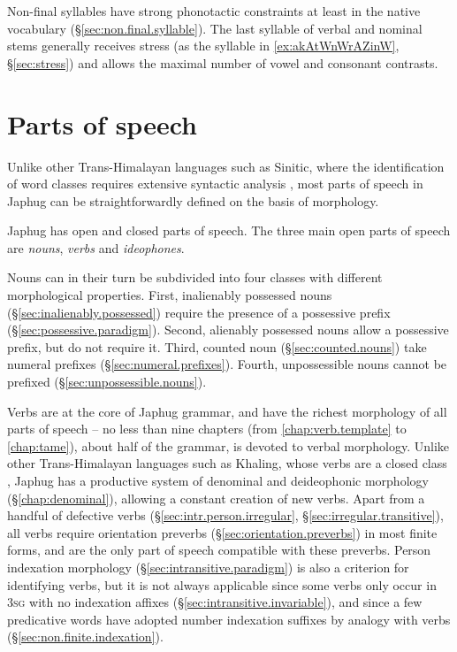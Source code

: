 Non-final syllables have strong phonotactic constraints at least in the native vocabulary (§\ref{sec:non.final.syllable}). The last syllable of verbal and nominal stems generally receives stress (as the syllable  in \ref{ex:akAtWnWrAZinW}, §\ref{sec:stress}) and allows the maximal number of vowel and consonant contrasts.


\section{Parts of speech} \label{sec:parts.speech.introduction}
Unlike other Trans-Himalayan languages such as Sinitic, where the identification of word classes requires extensive syntactic analysis \citep{gabelentz1881chinesische, chao68chinese}, most parts of speech in Japhug can be straightforwardly defined on the basis of morphology. 

Japhug has open and closed parts of speech. The three main open parts of speech are \textit{nouns}, \textit{verbs} and \textit{ideophones}.

Nouns can in their turn be subdivided into four classes with different morphological properties. First, inalienably possessed nouns (§\ref{sec:inalienably.possessed}) require the presence of a possessive prefix (§\ref{sec:possessive.paradigm}). Second, alienably possessed nouns allow a possessive prefix, but do not require it. Third, counted noun (§\ref{sec:counted.nouns}) take numeral prefixes (§\ref{sec:numeral.prefixes}). Fourth, unpossessible nouns cannot be prefixed (§\ref{sec:unpossessible.nouns}).

Verbs are at the core of Japhug grammar, and have the richest morphology of all parts of speech -- no less than nine chapters (from \ref{chap:verb.template} to \ref{chap:tame}), about half of the grammar, is devoted to verbal morphology. Unlike other Trans-Himalayan languages such as Khaling, 
whose verbs are a closed class \citep{jacques12khaling}, Japhug has a productive system of denominal and deideophonic morphology (§\ref{chap:denominal}), allowing a constant creation of new verbs. Apart from a handful of defective verbs (§\ref{sec:intr.person.irregular}, §\ref{sec:irregular.transitive}), all verbs require orientation preverbs (§\ref{sec:orientation.preverbs}) in most finite forms, and are the only part of speech compatible with these preverbs. Person indexation morphology (§\ref{sec:intransitive.paradigm}) is also a criterion for identifying verbs, but it is not always applicable since some verbs only occur in \textsc{3sg} with no indexation affixes (§\ref{sec:intransitive.invariable}), and since a few predicative words have adopted number indexation suffixes by analogy with verbs (§\ref{sec:non.finite.indexation}).

